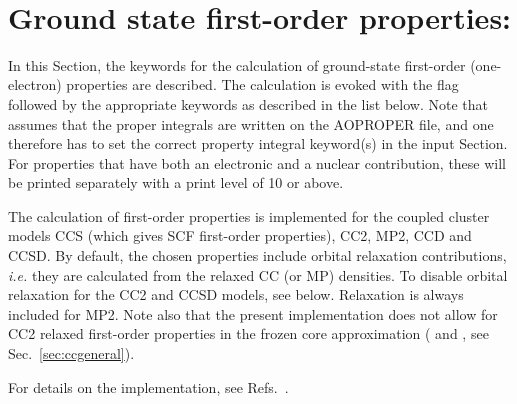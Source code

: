 ~%
\section{Ground state first-order properties: }
\label{sec:ccfop}

In this Section, the keywords for the calculation of ground-state first-order
(one-electron) properties are described. The calculation
is evoked with the  flag followed by the appropriate
keywords as described in the list below. Note that 
assumes that the proper integrals are written on the
AOPROPER file, and one therefore has to set the correct property
integral keyword(s) in the  input Section. For properties
that have both an electronic and a nuclear contribution, these will
be printed separately with a print level of 10 or above.

The calculation of first-order properties is implemented for the 
coupled cluster models CCS (which gives SCF first-order properties),
CC2, MP2, CCD and CCSD.  
By default, the chosen properties include orbital relaxation
contributions,
{\it i.e.\/} they are calculated from the relaxed CC (or MP) densities. 
To disable orbital relaxation for the CC2 and CCSD models, 
see  below. Relaxation is always included for MP2. 
Note also that the present implementation does not allow for 
CC2 relaxed first-order
properties in the frozen core approximation 
( and , see Sec.~\ref{sec:ccgeneral}).

For details on the implementation, see 
Refs.~\cite{Halkier:CCFOP,Halkier:CC2RLXFOP}.

\begin{center}
\end{center}

